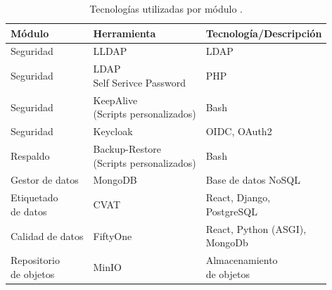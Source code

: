\begin{table}[H]
  \centering
  \caption[Tecnologías utilizadas]{Tecnologías utilizadas por módulo \footnotemark.}
  \begin{tabular}{l l l}
    \toprule
    \textbf{Módulo}  & \textbf{Herramienta}        & \textbf{Tecnología/Descripción}    \\ \hline
    \midrule
    Seguridad        & LLDAP                       & LDAP                               \\ \hline
    Seguridad        & \makecell[l]{LDAP                                                \\Self Serivce Password \citep{ltb_project_ldap_nodate}} & PHP                             \\ \hline
    Seguridad        & \makecell[l]{KeepAlive                                           \\(Scripts personalizados)}      & Bash                            \\ \hline
    Seguridad        & Keycloak                    & OIDC, OAuth2                       \\ \hline
    Respaldo         & \makecell[l]{Backup-Restore                                      \\(Scripts personalizados)} & Bash                            \\ \hline
    Gestor de datos  & MongoDB                     & Base de datos NoSQL                \\ \hline
    \makecell[l]{Etiquetado                                                             \\de datos}          & CVAT                                    & \makecell[l]{React, Django,                      \\PostgreSQL}                     \\ \hline
    Calidad de datos & FiftyOne                    & \makecell[l]{React, Python (ASGI), \\MongoDb}                        \\ \hline
    \makecell[l]{Repositorio                                                            \\de objetos}       & MinIO                                   & \makecell[l]{Almacenamiento \\de objetos }      \\ \hline

\end{tabular}
\end{table}
